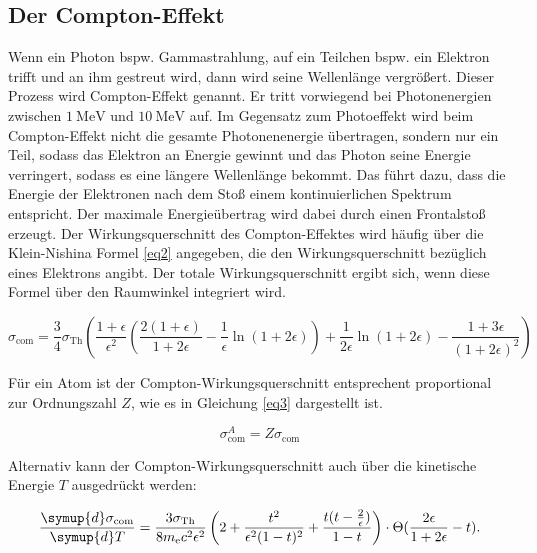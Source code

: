 \subsection{Der Compton-Effekt}
Wenn ein Photon bspw. Gammastrahlung, auf ein Teilchen bspw. ein Elektron trifft
und an ihm gestreut wird, dann wird seine Wellenlänge vergrößert. 
Dieser Prozess wird Compton-Effekt genannt.
Er tritt vorwiegend bei Photonenergien zwischen $\SI{1}{\mega\electronvolt}$ und 
$\SI{10}{\mega\electronvolt}$ auf.
Im Gegensatz zum Photoeffekt wird beim Compton-Effekt nicht die 
gesamte Photonenenergie übertragen, sondern nur ein Teil, sodass das Elektron an 
Energie gewinnt und das Photon seine Energie verringert, sodass es eine längere 
Wellenlänge bekommt. Das führt dazu, dass die Energie der Elektronen nach dem 
Stoß einem kontinuierlichen Spektrum entspricht.
Der maximale Energieübertrag wird dabei durch einen Frontalstoß erzeugt.
Der Wirkungsquerschnitt des Compton-Effektes wird häufig über die 
Klein-Nishina Formel \ref{eq2} angegeben, die den Wirkungsquerschnitt bezüglich 
eines Elektrons angibt. Der totale Wirkungsquerschnitt ergibt sich, wenn diese 
Formel über den Raumwinkel integriert wird.

\begin{equation}
    \sigma_{\text{com}} = \frac{3}{4}\sigma_{\text{Th}} \left(\frac{1 + \epsilon}{\epsilon^2} \left(\frac{2(1+\epsilon)}{1+2\epsilon} - \frac{1}{\epsilon} \ln(1+2\epsilon) \right) + \frac{1}{2\epsilon} \ln(1+2\epsilon) - \frac{1+3\epsilon}{(1+2\epsilon)^2} \right)
    \label{eq2}
\end{equation}

Für ein Atom ist der Compton-Wirkungsquerschnitt entsprechent proportional zur 
Ordnungszahl $Z$, wie es in Gleichung \ref{eq3} dargestellt ist.

\begin{equation}
    \sigma^A_{\text{com}} = Z \sigma_{\text{com}}
    \label{eq3}
\end{equation}

Alternativ kann der Compton-Wirkungsquerschnitt auch über die kinetische 
Energie $T$ ausgedrückt werden:

\begin{equation}
    \frac{\symup{d} \sigma_{\text{com}}}{\symup{d}T} = \frac{3\sigma_{\text{Th}}}{8 m_{\text{e}} c^2 \epsilon^2} \left(2+ \frac{t^2}{\epsilon^2(1-t)^2} + \frac{t(t-\frac{2}{\epsilon})}{1-t} \right) \cdot \Theta( \frac{2 \epsilon}{1+ 2 \epsilon}-t).
    \label{2.12}
\end{equation}

